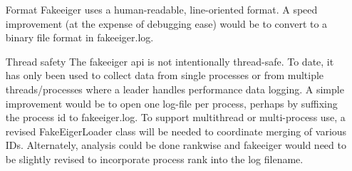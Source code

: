 \begin{itemize}
\item[Format] Fakeeiger uses a human-readable, line-oriented format. A speed improvement (at the expense of debugging ease) would be to convert to a binary file format in fakeeiger.log.
\item[Thread safety] The fakeeiger api is not intentionally thread-safe. To date, it has only been used to collect data from single processes or from multiple threads/processes where a leader handles performance data logging. A simple improvement would be to open one log-file per process, perhaps by suffixing the process id to fakeeiger.log. To support multithread or multi-process use, a revised FakeEigerLoader class will be needed to coordinate merging of various IDs. Alternately, analysis could be done rankwise and fakeeiger would need to be slightly revised to incorporate process rank into the log filename.
\end{itemize}
